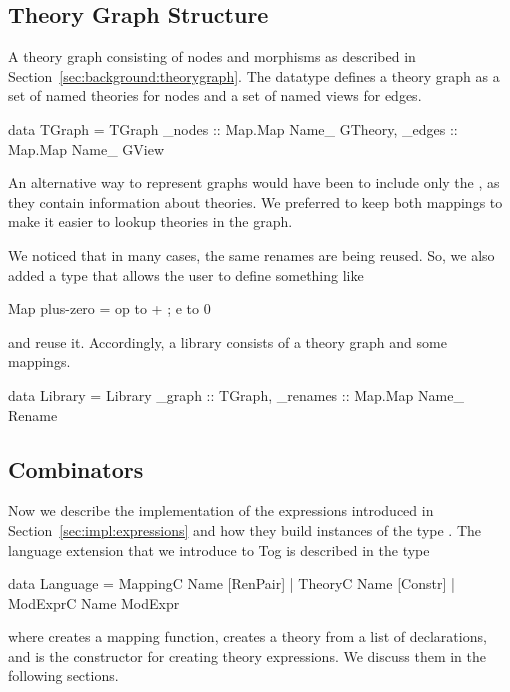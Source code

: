 \subsection{Theory Graph Structure}
\label{subsec:graph}
A theory graph consisting of nodes and morphisms as described in Section~\ref{sec:background:theorygraph}. The datatype  defines a theory graph as a set of named theories for nodes and a set of named views for edges. 
\begin{hscode}
data TGraph = TGraph { 
  _nodes :: Map.Map Name_ GTheory,
  _edges :: Map.Map Name_ GView } 
\end{hscode}
An alternative way to represent graphs would have been to include only the , as they contain information about theories. We preferred to keep both mappings to make it easier to lookup theories in the graph. 

We noticed that in many cases, the same renames are being reused. So, we also added a  type that allows the user to define something like 
\begin{hscode}
Map plus-zero = {op to + ; e to 0}
\end{hscode}
\noindent and reuse it. Accordingly, a library consists of a theory graph and some mappings. 
\begin{hscode}
data Library = Library {
  _graph   :: TGraph,
  _renames :: Map.Map Name_ Rename }
\end{hscode}

\subsection{Combinators}
\label{subsec:combinatorsImpl}
Now we describe the implementation of the expressions introduced in Section~\ref{sec:impl:expressions} and how they build instances of the type .  
The language extension that we introduce to Tog is described in the type  
\begin{togcode}
data Language = 
    MappingC Name [RenPair]
  | TheoryC Name [Constr]
  | ModExprC Name ModExpr
\end{togcode}
\noindent where  creates a mapping function,  creates a theory from a list of declarations, and  is the constructor for creating theory expressions. We discuss them in the following sections. 


